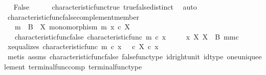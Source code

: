 \begin{isabellebody}
\ \isamarkupfalse%
\ False\isanewline
\ \ \ \ \isamarkupfalse%
\ characteristic{\isacharunderscore}{\kern0pt}func{\isacharunderscore}{\kern0pt}true\ true{\isacharunderscore}{\kern0pt}false{\isacharunderscore}{\kern0pt}distinct\ \isamarkupfalse%
\ auto\isanewline
{}\isamarkupfalse%
%
\endisatagproof
{\isafoldproof}%
%
\isadelimproof
\isanewline
%
\endisadelimproof
\isanewline
{}\isamarkupfalse%
\ characteristic{\isacharunderscore}{\kern0pt}func{\isacharunderscore}{\kern0pt}false{\isacharunderscore}{\kern0pt}complement{\isacharunderscore}{\kern0pt}member{\isacharcolon}{\kern0pt}\isanewline
\ \ \ {\isachardoublequoteopen}m\ {\isacharcolon}{\kern0pt}\ B\ {\isasymrightarrow}\ X{\isachardoublequoteclose}\ {\isachardoublequoteopen}monomorphism\ m{\isachardoublequoteclose}\ {\isachardoublequoteopen}x\ {\isasymin}\isactrlsub c\ X{\isachardoublequoteclose}\isanewline
\ \ \ characteristic{\isacharunderscore}{\kern0pt}func{\isacharunderscore}{\kern0pt}false{\isacharcolon}{\kern0pt}\ {\isachardoublequoteopen}characteristic{\isacharunderscore}{\kern0pt}func\ m\ {\isasymcirc}\isactrlsub c\ x\ {\isacharequal}{\kern0pt}\ {\isasymf}{\isachardoublequoteclose}\isanewline
\ \ \ {\isachardoublequoteopen}x\ {\isasymin}\isactrlbsub X\isactrlesub \ {\isacharparenleft}{\kern0pt}X\ {\isasymsetminus}\ {\isacharparenleft}{\kern0pt}B{\isacharcomma}{\kern0pt}\ m{\isacharparenright}{\kern0pt}{\isacharcomma}{\kern0pt}m\isactrlsup c{\isacharparenright}{\kern0pt}{\isachardoublequoteclose}\isanewline
%
\isadelimproof
%
\endisadelimproof
%
\isatagproof
{}\isamarkupfalse%
\ {\isacharminus}{\kern0pt}\isanewline
\ \ \isamarkupfalse%
\ x{\isacharunderscore}{\kern0pt}equalizes{\isacharcolon}{\kern0pt}\ {\isachardoublequoteopen}characteristic{\isacharunderscore}{\kern0pt}func\ m\ {\isasymcirc}\isactrlsub c\ x\ {\isacharequal}{\kern0pt}\ {\isasymf}\ {\isasymcirc}\isactrlsub c\ {\isasymbeta}\isactrlbsub X\isactrlesub \ {\isasymcirc}\isactrlsub c\ x{\isachardoublequoteclose}\isanewline
\ \ \ \ \isamarkupfalse%
\ {\isacharparenleft}{\kern0pt}metis\ assms{\isacharparenleft}{\kern0pt}{}{\isacharparenright}{\kern0pt}\ characteristic{\isacharunderscore}{\kern0pt}func{\isacharunderscore}{\kern0pt}false\ false{\isacharunderscore}{\kern0pt}func{\isacharunderscore}{\kern0pt}type\ id{\isacharunderscore}{\kern0pt}right{\isacharunderscore}{\kern0pt}unit{}\ id{\isacharunderscore}{\kern0pt}type\ one{\isacharunderscore}{\kern0pt}unique{\isacharunderscore}{\kern0pt}element\ terminal{\isacharunderscore}{\kern0pt}func{\isacharunderscore}{\kern0pt}comp\ terminal{\isacharunderscore}{\kern0pt}func{\isacharunderscore}{\kern0pt}type{\isacharparenright}{\kern0pt}\isanewline

\end{isabellebody}
